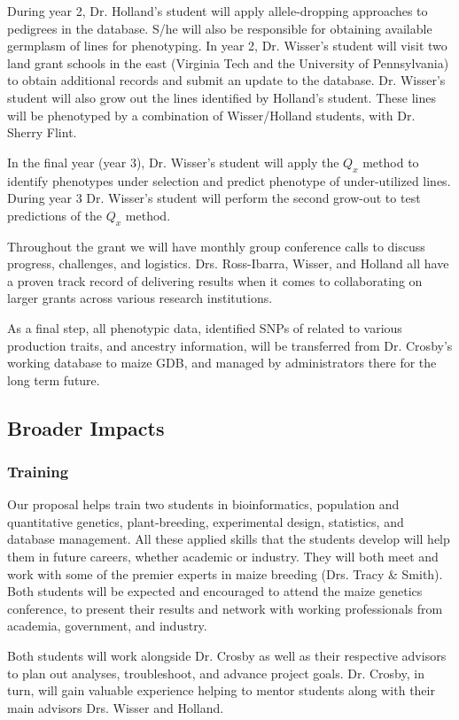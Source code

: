 \documentclass[12pt]{article}
\begin{document}
During year 2, Dr. Holland's student will apply allele-dropping approaches to pedigrees in the database. 
S/he will also be responsible for obtaining available germplasm of lines for phenotyping. 
In year 2, Dr. Wisser's student will visit two land grant schools in the east (Virginia Tech and the University of Pennsylvania) to obtain additional records and submit an update to the database. 
Dr. Wisser's student will also grow out the lines identified by Holland's student. 
These lines will be phenotyped by a combination of Wisser/Holland students, with Dr. Sherry Flint.

In the final year (year 3), Dr. Wisser's student will apply the $Q_{x}$ method to identify phenotypes under selection and predict phenotype of under-utilized lines.
During year 3 Dr. Wisser's student will perform the second grow-out to test predictions of the $Q_{x}$ method.

Throughout the grant we will have monthly group conference calls to discuss progress, challenges, and logistics. Drs. Ross-Ibarra, Wisser, and Holland all have a proven track record of delivering results when it comes to collaborating on larger grants across various research institutions. 

As a final step, all phenotypic data, identified SNPs of related to various production traits, and ancestry information, will be transferred from Dr. Crosby's working database to maize GDB, and managed by administrators there for the long term future.

\subsection*{Broader Impacts}

\subsubsection*{Training}
Our proposal helps train two students in bioinformatics, population and quantitative genetics, plant-breeding, experimental design, statistics, and database management. 
All these applied skills that the students develop will help them in future careers, whether academic or industry. 
They will both meet and work with some of the premier experts in maize breeding (Drs. Tracy \& Smith).
Both students will be expected and encouraged to attend the maize genetics conference, to present their results and network with working professionals from academia, government, and industry.

Both students will work alongside Dr. Crosby as well as their respective advisors to plan out analyses, troubleshoot, and advance project goals. 
Dr. Crosby, in turn, will gain valuable experience helping to mentor students along with their main advisors Drs. Wisser and Holland. 
\end{document}
